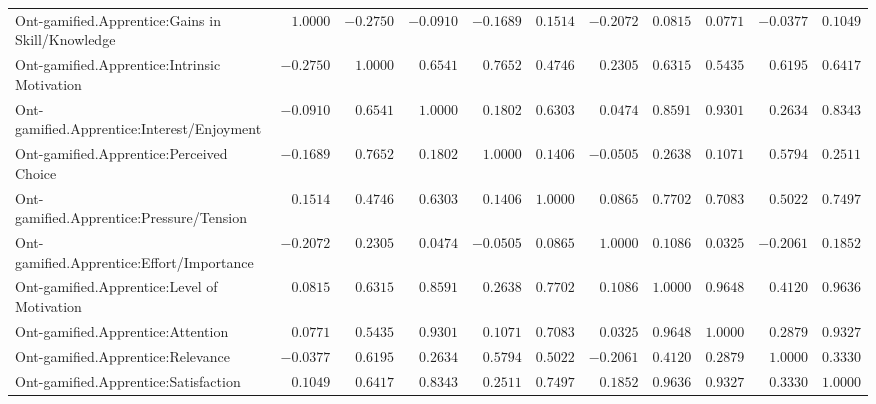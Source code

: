 \begin{landscape}
{\begin{longtable}{lrrrrrrrrrr}
Ont-gamified.Apprentice:Gains in Skill/Knowledge&$ 1.0000$&$-0.2750$&$-0.0910$&$-0.1689$&$0.1514$&$-0.2072$&$0.0815$&$0.0771$&$-0.0377$&$0.1049$\tabularnewline
Ont-gamified.Apprentice:Intrinsic Motivation&$-0.2750$&$ 1.0000$&$ 0.6541$&$ 0.7652$&$0.4746$&$ 0.2305$&$0.6315$&$0.5435$&$ 0.6195$&$0.6417$\tabularnewline
Ont-gamified.Apprentice:Interest/Enjoyment&$-0.0910$&$ 0.6541$&$ 1.0000$&$ 0.1802$&$0.6303$&$ 0.0474$&$0.8591$&$0.9301$&$ 0.2634$&$0.8343$\tabularnewline
Ont-gamified.Apprentice:Perceived Choice&$-0.1689$&$ 0.7652$&$ 0.1802$&$ 1.0000$&$0.1406$&$-0.0505$&$0.2638$&$0.1071$&$ 0.5794$&$0.2511$\tabularnewline
Ont-gamified.Apprentice:Pressure/Tension&$ 0.1514$&$ 0.4746$&$ 0.6303$&$ 0.1406$&$1.0000$&$ 0.0865$&$0.7702$&$0.7083$&$ 0.5022$&$0.7497$\tabularnewline
Ont-gamified.Apprentice:Effort/Importance&$-0.2072$&$ 0.2305$&$ 0.0474$&$-0.0505$&$0.0865$&$ 1.0000$&$0.1086$&$0.0325$&$-0.2061$&$0.1852$\tabularnewline
Ont-gamified.Apprentice:Level of Motivation&$ 0.0815$&$ 0.6315$&$ 0.8591$&$ 0.2638$&$0.7702$&$ 0.1086$&$1.0000$&$0.9648$&$ 0.4120$&$0.9636$\tabularnewline
Ont-gamified.Apprentice:Attention&$ 0.0771$&$ 0.5435$&$ 0.9301$&$ 0.1071$&$0.7083$&$ 0.0325$&$0.9648$&$1.0000$&$ 0.2879$&$0.9327$\tabularnewline
Ont-gamified.Apprentice:Relevance&$-0.0377$&$ 0.6195$&$ 0.2634$&$ 0.5794$&$0.5022$&$-0.2061$&$0.4120$&$0.2879$&$ 1.0000$&$0.3330$\tabularnewline
Ont-gamified.Apprentice:Satisfaction&$ 0.1049$&$ 0.6417$&$ 0.8343$&$ 0.2511$&$0.7497$&$ 0.1852$&$0.9636$&$0.9327$&$ 0.3330$&$1.0000$\tabularnewline
\hline

\end{longtable}}\end{landscape}

